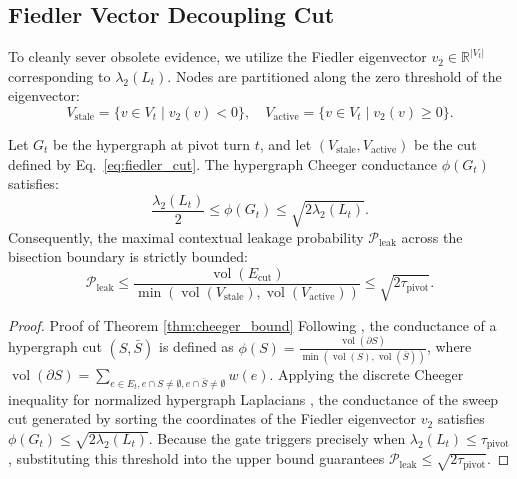 \documentclass[ijds,dblanonrev]{informs4}
\DeclareMathOperator{\vol}{vol}
\newcommand{\R}{\mathbb{R}}
\begin{document}
\subsection{Fiedler Vector Decoupling Cut}
To cleanly sever obsolete evidence, we utilize the Fiedler eigenvector $v_2 \in \R^{|V_t|}$ corresponding to $\lambda_2(L_t)$. Nodes are partitioned along the zero threshold of the eigenvector:
\begin{equation}
  V_{\text{stale}} = \{v \in V_t \mid v_2(v) < 0\}, \quad V_{\text{active}} = \{v \in V_t \mid v_2(v) \ge 0\}.
  \label{eq:fiedler_cut}
\end{equation}

\begin{theorem}
\label{thm:cheeger_bound}
Let $G_t$ be the hypergraph at pivot turn $t$, and let $(V_{\text{stale}}, V_{\text{active}})$ be the cut defined by Eq.~\eqref{eq:fiedler_cut}. The hypergraph Cheeger conductance $\phi(G_t)$ satisfies:
\begin{equation}
  \frac{\lambda_2(L_t)}{2} \le \phi(G_t) \le \sqrt{2 \lambda_2(L_t)}.
  \label{eq:cheeger_ineq}
\end{equation}
Consequently, the maximal contextual leakage probability $\mathcal{P}_{\text{leak}}$ across the bisection boundary is strictly bounded:
\begin{equation}
  \mathcal{P}_{\text{leak}} \le \frac{\vol(E_{\text{cut}})}{\min(\vol(V_{\text{stale}}), \vol(V_{\text{active}}))} \le \sqrt{2 \tau_{\text{pivot}}}.
  \label{eq:leakage_bound}
\end{equation}
\end{theorem}

\begin{proof}{Proof of Theorem \ref{thm:cheeger_bound}}
Following \cite{chung1997spectral}, the conductance of a hypergraph cut $(S, \bar{S})$ is defined as $\phi(S) = \frac{\vol(\partial S)}{\min(\vol(S), \vol(\bar{S}))}$, where $\vol(\partial S) = \sum_{e \in E_t, e \cap S \ne \emptyset, e \cap \bar{S} \ne \emptyset} w(e)$. Applying the discrete Cheeger inequality for normalized hypergraph Laplacians \citep{zhou2006learning}, the conductance of the sweep cut generated by sorting the coordinates of the Fiedler eigenvector $v_2$ satisfies $\phi(G_t) \le \sqrt{2 \lambda_2(L_t)}$. Because the gate triggers precisely when $\lambda_2(L_t) \le \tau_{\text{pivot}}$, substituting this threshold into the upper bound guarantees $\mathcal{P}_{\text{leak}} \le \sqrt{2 \tau_{\text{pivot}}}$.\Halmos
\end{proof}
\end{document}
